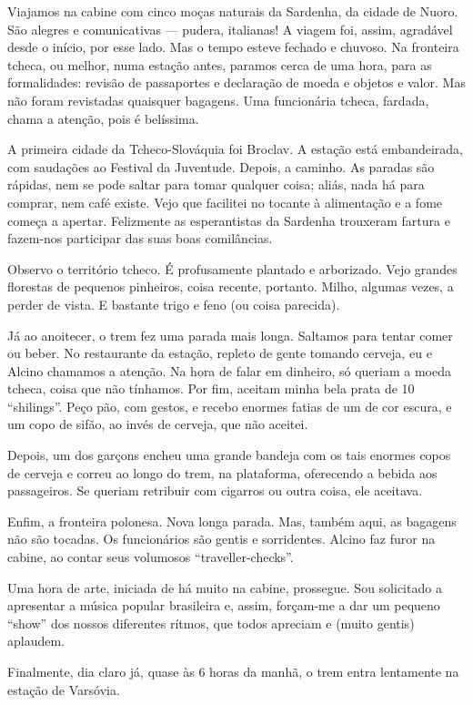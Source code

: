 Viajamos na cabine com cinco moças naturais da Sardenha, da cidade de Nuoro. São alegres e comunicativas --- pudera, italianas! A viagem foi, assim, agradável desde o início, por esse lado. Mas o tempo esteve fechado e chuvoso. Na fronteira tcheca, ou melhor, numa estação antes, paramos cerca de uma hora, para as formalidades: revisão de passaportes e declaração de moeda e objetos e valor. Mas não foram revistadas quaisquer bagagens. Uma funcionária tcheca, fardada, chama a atenção, pois é belíssima.

A primeira cidade da Tcheco-Slováquia foi Broclav. A estação está embandeirada, com saudações ao Festival da Juventude. Depois, a caminho. As paradas são rápidas, nem se pode saltar para tomar qualquer coisa; aliás, nada há para comprar, nem café existe. Vejo que facilitei no tocante à alimentação e a fome começa a apertar. Felizmente as esperantistas da Sardenha trouxeram fartura e fazem-nos participar das suas boas comilâncias.

Observo o território tcheco. É profusamente plantado e arborizado. Vejo grandes florestas de pequenos pinheiros, coisa recente, portanto. Milho, algumas vezes, a perder de vista. E bastante trigo e feno (ou coisa parecida).

Já ao anoitecer, o trem fez uma parada mais longa. Saltamos para tentar comer ou beber. No restaurante da estação, repleto de gente tomando cerveja, eu e Alcino chamamos a atenção. Na hora de falar em dinheiro, só queriam a moeda tcheca, coisa que não tínhamos. Por fim, aceitam minha bela prata de 10 ``shilings''. Peço pão, com gestos, e recebo enormes fatias de um de cor escura, e um copo de sifão, ao invés de cerveja, que não aceitei.

Depois, um dos garçons encheu uma grande bandeja com os tais enormes copos de cerveja e correu ao longo do trem, na plataforma, oferecendo a bebida aos passageiros. Se queriam retribuir com cigarros ou outra coisa, ele aceitava.

Enfim, a fronteira polonesa. Nova longa parada. Mas, também aqui, as bagagens não são tocadas. Os funcionários são gentis e sorridentes. Alcino faz furor na cabine, ao contar seus volumosos ``traveller-checks''.

Uma hora de arte, iniciada de há muito na cabine, prossegue. Sou solicitado a apresentar a música popular brasileira e, assim, forçam-me a dar um pequeno ``show'' dos nossos diferentes rítmos, que todos apreciam e (muito gentis) aplaudem.

Finalmente, dia claro já, quase às 6 horas da manhã, o trem entra lentamente na estação de Varsóvia.
